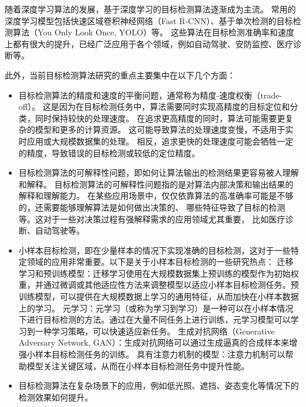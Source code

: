 随着深度学习算法的发展，基于深度学习的目标检测算法逐渐成为主流。
常用的深度学习模型包括快速区域卷积神经网络（Fast R-CNN）\cite{girshick2015fast}、基于单次检测的目标检测算法（You Only Look Once, YOLO）\cite{jiang2022review}等。
这些算法在目标检测准确率和速度上都有很大的提升，已经广泛应用于各个领域，例如自动驾驶、安防监控、医疗诊断等。
\par
此外，当前目标检测算法研究的重点主要集中在以下几个方面：
\begin{itemize}[itemindent=2em]
    \item 目标检测算法的精度和速度的平衡问题，通常称为精度-速度权衡（trade-off）。
    这是因为在目标检测任务中，算法需要同时实现高精度的目标定位和分类，同时保持较快的处理速度。
    在追求更高精度的同时，算法可能需要更复杂的模型和更多的计算资源。
    这可能导致算法的处理速度变慢，不适用于实时应用或大规模数据集的处理。
    相反，追求更快的处理速度可能会牺牲一定的精度，导致错误的目标检测或较低的定位精度。
    
    \item 目标检测算法的可解释性问题，即如何让算法输出的检测结果更容易被人理解和解释。
    目标检测算法的可解释性问题指的是对算法内部决策和输出结果的解释和理解能力。
    在某些应用场景中，仅仅依靠算法的高准确率可能是不够的，还需要能够理解算法是如何做出决策的、
    哪些特征导致了目标的检测等。这对于一些对决策过程有强解释需求的应用领域尤其重要，
    比如医疗诊断、自动驾驶等。
    
    \item 小样本目标检测，即在少量样本的情况下实现准确的目标检测，这对于一些特定领域的应用非常重要。以下是关于小样本目标检测的一些研究热点：
    迁移学习和预训练模型\cite{zhuang2020comprehensive}：迁移学习使用在大规模数据集上预训练的模型作为初始权重，并通过微调或其他适应性方法来调整模型以适应小样本目标检测任务。预训练模型，可以提供在大规模数据上学习的通用特征，从而加快在小样本数据上的学习。
    元学习\cite{hospedales2021meta}：元学习（或称为学习到学习）是一种可以在小样本情况下进行目标检测的方法。通过在大量不同任务上进行训练，元学习模型可以学习到一种学习策略，可以快速适应新任务。
    生成对抗网络（Generative Adversary Network, GAN）：生成对抗网络可以通过生成逼真的合成样本来增强小样本目标检测任务的训练。
    具有注意力机制的模型：注意力机制可以帮助模型关注关键区域，从而在小样本目标检测任务中提升性能。
    
    \item 目标检测算法在复杂场景下的应用，例如低光照、遮挡、姿态变化等情况下的检测效果如何提升。
    
\end{itemize}


